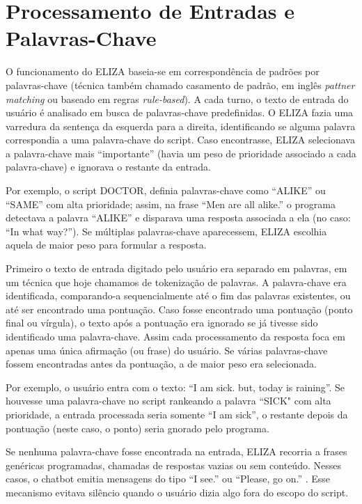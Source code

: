 \documentclass[a4paper,oneside]{book}
\begin{document}



\section{Processamento de Entradas e Palavras-Chave}

O funcionamento do ELIZA baseia-se em correspondência de padrões por palavras-chave (técnica também chamado casamento de padrão, em inglês \textit{pattner matching} ou baseado em regras \textit{rule-based}). A cada turno, o texto de entrada do usuário é analisado em busca de palavras-chave predefinidas. O ELIZA fazia uma varredura da sentença da esquerda para a direita, identificando se alguma palavra correspondia a uma palavra-chave do script. Caso encontrasse, ELIZA selecionava a palavra-chave mais “importante” (havia um peso de prioridade associado a cada palavra-chave) e ignorava o restante da entrada.

Por exemplo, o script DOCTOR, definia palavras-chave como “ALIKE” ou “SAME” com alta prioridade; assim, na frase “Men are all alike.” o programa detectava a palavra “ALIKE” e disparava uma resposta associada a ela (no caso: “In what way?”). Se múltiplas palavras-chave aparecessem, ELIZA escolhia aquela de maior peso para formular a resposta.

Primeiro o texto de entrada digitado pelo usuário era separado em palavras, em um técnica que hoje chamamos de tokenização de palavras. A palavra-chave era identificada, comparando-a sequencialmente até o fim das palavras existentes, ou até ser encontrado uma pontuação. Caso fosse encontrado uma pontuação (ponto final ou vírgula), o texto após a pontuação era ignorado se já tivesse sido identificado uma palavra-chave. Assim cada processamento da resposta foca em apenas uma única afirmação (ou frase) do usuário. Se várias palavras-chave fossem encontradas antes da pontuação, a de maior peso era selecionada.

Por exemplo, o usuário entra com o texto: “I am sick. but, today is raining”. Se houvesse uma palavra-chave no script rankeando a palavra “SICK" com alta prioridade, a entrada processada seria somente “I am sick”, o restante depois da pontuação (neste caso, o ponto) seria gnorado pelo programa.

Se nenhuma palavra-chave fosse encontrada na entrada, ELIZA recorria a frases genéricas programadas, chamadas de respostas vazias ou sem conteúdo. Nesses casos, o chatbot emitia mensagens do tipo “I see.” ou “Please, go on.” . Esse mecanismo evitava silêncio quando o usuário dizia algo fora do escopo do script.
\end{document}

